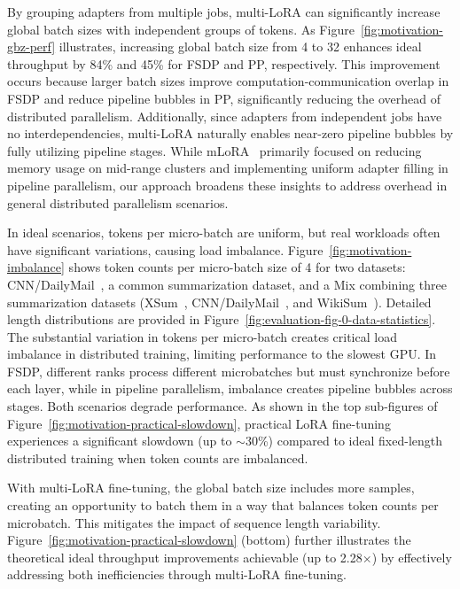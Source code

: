 By grouping adapters from multiple jobs, multi-LoRA can significantly increase global batch sizes with independent groups of tokens.
As Figure~\ref{fig:motivation-gbz-perf} illustrates, increasing global batch size from 4 to 32 enhances ideal throughput by 84\% and 45\% for FSDP and PP, respectively.
This improvement occurs because larger batch sizes improve computation-communication overlap in FSDP and reduce pipeline bubbles in PP, significantly reducing the overhead of distributed parallelism.
Additionally, since adapters from independent jobs have no interdependencies, multi-LoRA naturally enables near-zero pipeline bubbles by fully utilizing pipeline stages.
While mLoRA~\cite{ye2023mlora} primarily focused on reducing memory usage on mid-range clusters and implementing uniform adapter filling in pipeline parallelism, our approach broadens these insights to address overhead in general distributed parallelism scenarios.

In ideal scenarios, tokens per micro-batch are uniform, but real workloads often have significant variations, causing load imbalance. 
Figure~\ref{fig:motivation-imbalance} shows token counts per micro-batch size of 4 for two datasets: CNN/DailyMail~\cite{cnn-dailymail-dataset}, a common summarization dataset, and a Mix combining three summarization datasets (XSum~\cite{xsum-dataset}, CNN/DailyMail~\cite{cnn-dailymail-dataset}, and WikiSum~\cite{wikisum-dataset}). 
Detailed length distributions are provided in Figure~\ref{fig:evaluation-fig-0-data-statistics}. 
The substantial variation in tokens per micro-batch creates critical load imbalance in distributed training, limiting performance to the slowest GPU. In FSDP, different ranks process different microbatches but must synchronize before each layer, while in pipeline parallelism, imbalance creates pipeline bubbles across stages. 
Both scenarios degrade performance. 
As shown in the top sub-figures of Figure~\ref{fig:motivation-practical-slowdown}, practical LoRA fine-tuning experiences a significant slowdown (up to $\sim$30\%) compared to ideal fixed-length distributed training when token counts are imbalanced.

With multi-LoRA fine-tuning, the global batch size includes more samples, creating an opportunity to batch them in a way that balances token counts per microbatch. This mitigates the impact of sequence length variability. 
Figure~\ref{fig:motivation-practical-slowdown} (bottom) further illustrates the theoretical ideal throughput improvements achievable (up to 2.28$\times$) by effectively addressing both inefficiencies through multi-LoRA fine-tuning.


